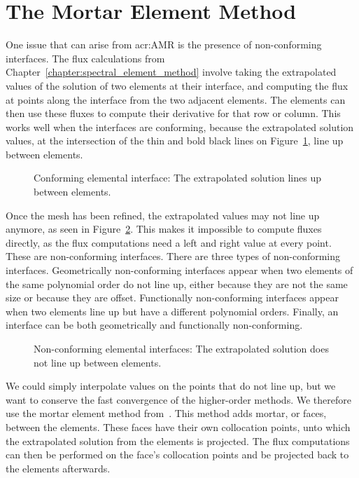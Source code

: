 \section{The Mortar Element Method}\label{section:adaptive_mesh_refinement:mortar_element_method}

One issue that can arise from \acrshort{acr:AMR} is the presence of non-conforming interfaces. The
flux calculations from Chapter~\ref{chapter:spectral_element_method} involve taking the extrapolated
values of the solution of two elements at their interface, and computing the flux at points along
the interface from the two adjacent elements. The elements can then use these fluxes to compute
their derivative for that row or column. This works well when the interfaces are conforming, because
the extrapolated solution values, at the intersection of the thin and bold black lines on
Figure~\ref{fig:conforming_interfaces}, line up between elements.

\begin{figure}[H]
    \centering
    
    \caption{Conforming elemental interface: The extrapolated solution lines up between elements.}\label{fig:conforming_interfaces}
\end{figure}

Once the mesh has been refined, the extrapolated values may not line up anymore, as seen in
Figure~\ref{fig:non_conforming_interfaces}. This makes it impossible to compute fluxes directly, as
the flux computations need a left and right value at every point. These are non-conforming
interfaces. There are three types of non-conforming interfaces. Geometrically non-conforming
interfaces appear when two elements of the same polynomial order do not line up, either because they
are not the same size or because they are offset. Functionally non-conforming interfaces appear when
two elements line up but have a different polynomial orders. Finally, an interface can be both
geometrically and functionally non-conforming.

\begin{figure}[H]
    \centering
    
    \caption{Non-conforming elemental interfaces: The extrapolated solution does not line up between elements.}\label{fig:non_conforming_interfaces}
\end{figure}

We could simply interpolate values on the points that do not line up, but we want to conserve the
fast convergence of the higher-order methods. We therefore use the mortar element method
from~\cite{Maday1989}. This method adds mortar, or faces, between the elements. These faces have
their own collocation points, unto which the extrapolated solution from the elements is projected.
The flux computations can then be performed on the face's collocation points and be projected back
to the elements afterwards.

